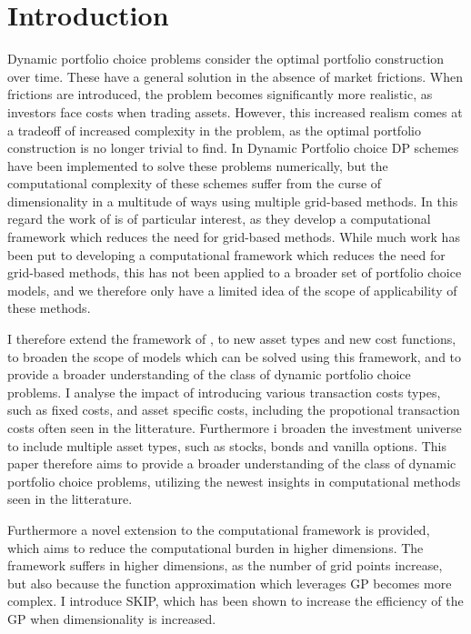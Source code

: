 \documentclass[11pt]{article}
\begin{document}
\fi

\section{Introduction}\label{sec:Introduction}

Dynamic portfolio choice problems consider the optimal portfolio construction over time.
These have a general solution in the absence of market frictions.
When frictions are introduced, the problem becomes significantly more realistic, as 
investors face costs when trading assets.
However, this increased realism comes at a tradeoff of increased complexity in the problem,
as the optimal portfolio construction is no longer trivial to find.
In Dynamic Portfolio choice \ac{DP} schemes have been implemented to solve these problems numerically,
but the computational complexity of these schemes suffer from the curse of dimensionality
in a multitude of ways using multiple grid-based methods. In this regard the work of \textcite{Scheidegger2023} is of particular interest,
as they develop a computational framework which reduces the need for grid-based methods.
While much work has been put to developing a computational framework which reduces the need for grid-based methods,
this has not been applied to a broader set of portfolio choice models, 
and we therefore only have a limited idea of the scope of applicability of these methods.

I therefore extend the framework of \textcite{Scheidegger2023}, to new asset types and new cost functions,
to broaden the scope of models which can be solved using this framework, and to provide a broader understanding of the class of dynamic portfolio choice problems.
I analyse the impact of introducing various transaction costs types, such as fixed costs, and asset specific costs,
including the propotional transaction costs often seen in the litterature.
Furthermore i broaden the investment universe to include multiple asset types, such as stocks, bonds and vanilla options.
This paper therefore aims to provide a broader understanding of the class of dynamic portfolio choice problems,
utilizing the newest insights in computational methods seen in the litterature.

Furthermore a novel extension to the computational framework is provided, which aims to
reduce the computational burden in higher dimensions.
The framework suffers in higher dimensions, as the number of grid points increase, but also because the function approximation which leverages \ac{GP} becomes more complex.
I introduce \ac{SKIP}, which has been shown to increase the efficiency of the \ac{GP} when dimensionality is increased.
\end{document}
